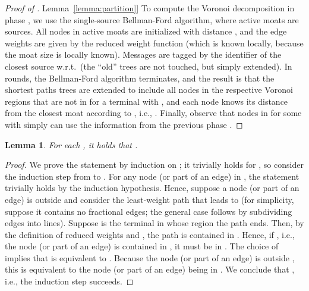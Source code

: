 \documentclass[letterpaper,11pt]{article}
\newtheorem{lemma}[theorem]{Lemma}
\newcommand{\namedref}[2]{\hyperref[#2]{#1~\ref*{#2}}}
\newcommand{\lemmaref}[1]{\namedref{Lemma}{#1}}
\begin{document}
\begin{proof}[Proof of \lemmaref{lemma:partition}]
To compute the Voronoi decomposition in phase , we use the single-source
Bellman-Ford algorithm, where active moats are sources.
All nodes in active moats are initialized with distance , and the edge
weights are given by the reduced weight function  (which is known
locally, because the moat size is locally known). Messages are tagged by the
identifier of the closest source w.r.t.\  (the ``old'' trees are not
touched, but simply extended). In  rounds, the Bellman-Ford algorithm
terminates, and the result is that the shortest paths trees are extended to
include all nodes in the respective Voronoi regions  that are not in
 for a terminal  with , and each node
knows its distance from the closest moat according to , i.e.,
. Finally, observe that nodes in 
for some  with  simply can use the information
from the previous phase .
\end{proof}

\begin{lemma}\label{lemma:decomp}
For each , it holds that .
\end{lemma}
\begin{proof}
We prove the statement by induction on ; it trivially holds for , so
consider the induction step from  to . For any node (or part of an edge)
in ,
the statement trivially holds by the induction hypothesis. Hence, suppose a node
(or part of an edge) is outside  and
consider the least-weight path  that leads to  (for simplicity, suppose it contains no
fractional edges; the general case follows by subdividing edges into lines).
Suppose  is the terminal in whose region  the path ends.
Then, by the definition of reduced weights and , the path is
contained in .
Hence, if , i.e., the node (or part
of an edge) is contained in , it must be in . The choice of  implies that  is
equivalent to . Because
the node (or part of an edge) is outside , this is equivalent to the node (or
part of an edge) being in . We
conclude that , i.e., the
induction step succeeds.
\end{proof}
\end{document}

